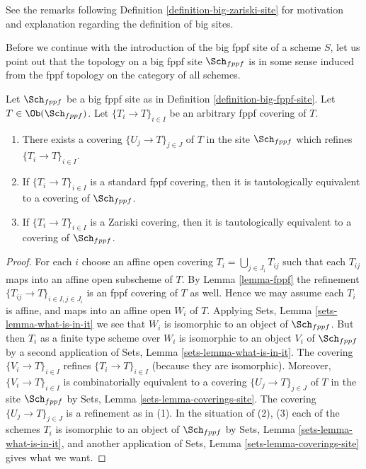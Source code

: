 \noindent
See the remarks following Definition \ref{definition-big-zariski-site}
for motivation and explanation regarding the definition of big sites.

\medskip\noindent
Before we continue with the introduction of the big fppf site of
a scheme $S$, let us point out that the topology on a big fppf site
$\Sch_{fppf}$ is in some sense induced from the fppf topology
on the category of all schemes.

\begin{lemma}
\label{lemma-fppf-induced}
Let $\Sch_{fppf}$ be a big fppf site as in
Definition \ref{definition-big-fppf-site}.
Let $T \in \Ob(\Sch_{fppf})$.
Let $\{T_i \to T\}_{i \in I}$ be an arbitrary fppf covering of $T$.
\begin{enumerate}
\item There exists a covering $\{U_j \to T\}_{j \in J}$ of $T$ in the site
$\Sch_{fppf}$ which refines $\{T_i \to T\}_{i \in I}$.
\item If $\{T_i \to T\}_{i \in I}$ is a standard fppf covering, then
it is tautologically equivalent to a covering of $\Sch_{fppf}$.
\item If $\{T_i \to T\}_{i \in I}$ is a Zariski covering, then
it is tautologically equivalent to a covering of $\Sch_{fppf}$.
\end{enumerate}
\end{lemma}

\begin{proof}
For each $i$ choose an affine open covering $T_i = \bigcup_{j \in J_i} T_{ij}$
such that each $T_{ij}$ maps into an affine open subscheme of $T$. By
Lemma \ref{lemma-fppf}
the refinement $\{T_{ij} \to T\}_{i \in I, j \in J_i}$ is an fppf covering
of $T$ as well. Hence we may assume each $T_i$ is affine, and maps into
an affine open $W_i$ of $T$. Applying
Sets, Lemma \ref{sets-lemma-what-is-in-it}
we see that $W_i$ is isomorphic to an object of $\Sch_{fppf}$.
But then $T_i$ as a finite type scheme over $W_i$
is isomorphic to an object $V_i$ of $\Sch_{fppf}$ by a second
application of
Sets, Lemma \ref{sets-lemma-what-is-in-it}.
The covering $\{V_i \to T\}_{i \in I}$ refines $\{T_i \to T\}_{i \in I}$
(because they are isomorphic).
Moreover, $\{V_i \to T\}_{i \in I}$ is combinatorially equivalent to a
covering $\{U_j \to T\}_{j \in J}$ of $T$ in the site
$\Sch_{fppf}$ by
Sets, Lemma \ref{sets-lemma-coverings-site}.
The covering $\{U_j \to T\}_{j \in J}$ is a refinement as in (1).
In the situation of (2), (3) each of the
schemes $T_i$ is isomorphic to an object of $\Sch_{fppf}$ by
Sets, Lemma \ref{sets-lemma-what-is-in-it},
and another application of
Sets, Lemma \ref{sets-lemma-coverings-site}
gives what we want.
\end{proof}

